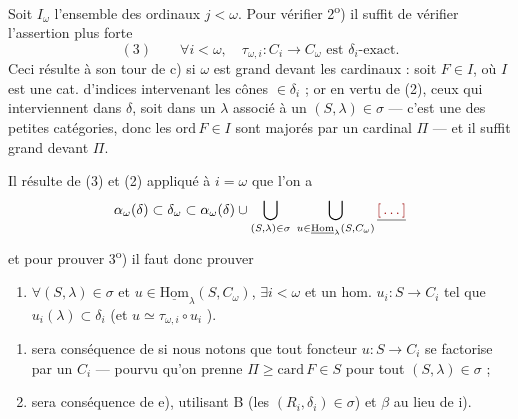 \documentclass[11pt,a4paper]{article}
\begin{document}
 Soit $I_{\omega}$ l'ensemble des ordinaux $j < \omega$. Pour
vérifier 2\textsuperscript{o}) il suffit de vérifier l'assertion plus forte
\[
  (3)\qquad \forall i < \omega, \quad
  \tau_{\omega,i} : C_{i} \to C_{\omega} \text{ est } \delta_{i}\text{-exact.}
\]
Ceci résulte à son tour de c) si $\omega$ est grand devant les cardinaux : soit
$F \in I$, où $I$ est une cat. d'indices intervenant  les cônes $\in
\delta_{i}$ ; or en vertu de (2),  
ceux qui interviennent dans $\delta$, soit dans un $\lambda$ associé à un
$(S, \lambda) \in \sigma$ — c'est une \ill{} \ill{} des petites catégories,
donc les $\mathrm{ord}\, F \in I$ sont majorés par un cardinal $\Pi$ — et il
suffit \struck{$\tau_{\omega}$} \add{$\omega$} grand devant $\Pi$.

Il résulte de (3) et (2) appliqué à $i = \omega$ que l'on a
\[
  \alpha_{\omega}(\delta) \subset \delta_{\omega} \subset
  \alpha_{\omega}(\delta) \cup \bigcup_{(S,\lambda) \in \sigma} \;
  \bigcup_{u \in \underline{\mathrm{Hom}}_{\lambda}(S, C_{\omega})}
  \struck{\ill{}}
\]
et pour prouver 3\textsuperscript{o}) il faut donc prouver

\begin{enumerate}
  \item[4)] $\forall (S,\lambda) \in \sigma$ et $u \in
    \underline{\mathrm{Hom}}_{\lambda}(S, C_{\omega})$, $\exists 
    i < \omega$ et un hom. $u_{i} : S \to C_{i}$ tel que $u_{i}(\lambda)
    \subset \delta_{i}$ (et $u \simeq \tau_{\omega,i} \circ u_{i}$
    ).
\end{enumerate}


\begin{enumerate}
  \item[a$_{1}$)] sera conséquence de  si nous notons que tout
    foncteur $u : S \to C_{i}$ se factorise par un $C_{i}$ — pourvu qu'on
    prenne $\Pi \geq \mathrm{card}\, F \in S$ pour tout $(S,\lambda) \in
    \sigma$ ;
  \item[a$_{2}$)] sera conséquence de e), utilisant B (les $(R_{i},
    \delta_{i}) \in \sigma$) et $\beta$   au lieu de i).
\end{enumerate}

\end{document}
